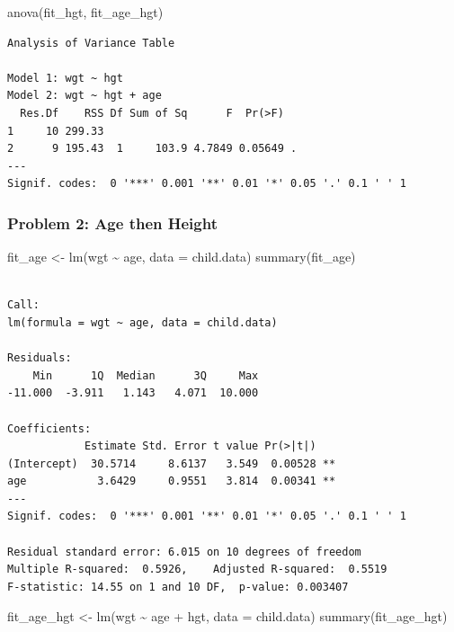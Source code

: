 \documentclass[
  letterpaper,
  DIV=11,
  numbers=noendperiod]{scrreprt}
\newenvironment{Shaded}{\begin{snugshade}}{\end{snugshade}}
\newcommand{\AttributeTok}[1]{\textcolor[rgb]{0.40,0.45,0.13}{#1}}
\newcommand{\FunctionTok}[1]{\textcolor[rgb]{0.28,0.35,0.67}{#1}}
\newcommand{\NormalTok}[1]{\textcolor[rgb]{0.00,0.23,0.31}{#1}}
\newcommand{\OtherTok}[1]{\textcolor[rgb]{0.00,0.23,0.31}{#1}}
\newcommand{\SpecialCharTok}[1]{\textcolor[rgb]{0.37,0.37,0.37}{#1}}
\begin{document}
\begin{Shaded}
\begin{Highlighting}[]
\FunctionTok{anova}\NormalTok{(fit\_hgt, fit\_age\_hgt)}
\end{Highlighting}
\end{Shaded}

\begin{verbatim}
Analysis of Variance Table

Model 1: wgt ~ hgt
Model 2: wgt ~ hgt + age
  Res.Df    RSS Df Sum of Sq      F  Pr(>F)  
1     10 299.33                              
2      9 195.43  1     103.9 4.7849 0.05649 .
---
Signif. codes:  0 '***' 0.001 '**' 0.01 '*' 0.05 '.' 0.1 ' ' 1
\end{verbatim}

\subsubsection{Problem 2: Age then
Height}\label{problem-2-age-then-height}

\begin{Shaded}
\begin{Highlighting}[]
\NormalTok{fit\_age }\OtherTok{\textless{}{-}} \FunctionTok{lm}\NormalTok{(wgt }\SpecialCharTok{\textasciitilde{}}\NormalTok{ age, }\AttributeTok{data =}\NormalTok{ child.data)}
\FunctionTok{summary}\NormalTok{(fit\_age)}
\end{Highlighting}
\end{Shaded}

\begin{verbatim}

Call:
lm(formula = wgt ~ age, data = child.data)

Residuals:
    Min      1Q  Median      3Q     Max 
-11.000  -3.911   1.143   4.071  10.000 

Coefficients:
            Estimate Std. Error t value Pr(>|t|)   
(Intercept)  30.5714     8.6137   3.549  0.00528 **
age           3.6429     0.9551   3.814  0.00341 **
---
Signif. codes:  0 '***' 0.001 '**' 0.01 '*' 0.05 '.' 0.1 ' ' 1

Residual standard error: 6.015 on 10 degrees of freedom
Multiple R-squared:  0.5926,    Adjusted R-squared:  0.5519 
F-statistic: 14.55 on 1 and 10 DF,  p-value: 0.003407
\end{verbatim}

\begin{Shaded}
\begin{Highlighting}[]
\NormalTok{fit\_age\_hgt }\OtherTok{\textless{}{-}} \FunctionTok{lm}\NormalTok{(wgt }\SpecialCharTok{\textasciitilde{}}\NormalTok{ age }\SpecialCharTok{+}\NormalTok{ hgt, }\AttributeTok{data =}\NormalTok{ child.data)}
\FunctionTok{summary}\NormalTok{(fit\_age\_hgt)}
\end{Highlighting}
\end{Shaded}
\end{document}
